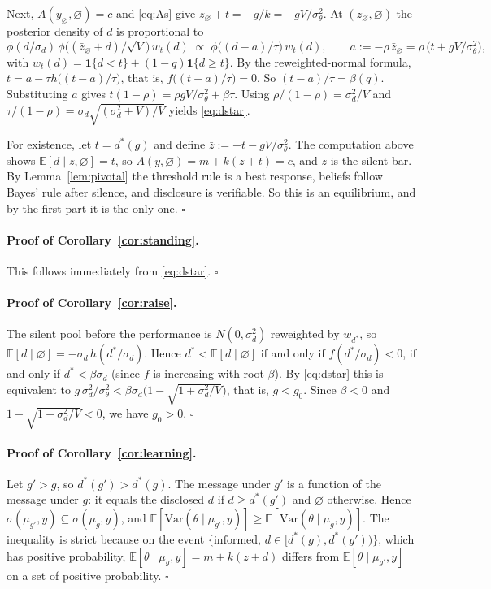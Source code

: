 \documentclass[11pt]{article}
\theoremstyle{definition}
\newcommand{\E}{\mathbb{E}}
\newcommand{\Var}{\mathrm{Var}}
\newcommand{\sil}{\varnothing}
\newcommand{\sd}{\sigma_d}
\newcommand{\sth}{\sigma_\theta}
\begin{document}
Next, $A(\bar y_\sil,\sil)=c$ and \eqref{eq:As} give $\bar z_\sil+t=-g/k=-gV/\sth^2$. At $(\bar z_\sil,\sil)$ the posterior density of $d$ is proportional to
\[
\phi(d/\sd)\,\phi\big((\bar z_\sil+d)/\sqrt V\big)\,w_t(d)\;\propto\;\phi\big((d-a)/\tau\big)\,w_t(d),\qquad a:=-\rho\,\bar z_\sil=\rho\,\big(t+gV/\sth^2\big),
\]
with $w_t(d)=\mathbf 1\{d<t\}+(1-q)\mathbf 1\{d\ge t\}$. By the reweighted-normal formula, $t=a-\tau h\big((t-a)/\tau\big)$, that is, $f\big((t-a)/\tau\big)=0$. So $(t-a)/\tau=\beta(q)$. Substituting $a$ gives $t(1-\rho)=\rho gV/\sth^2+\beta\tau$. Using $\rho/(1-\rho)=\sd^2/V$ and $\tau/(1-\rho)=\sd\sqrt{(\sd^2+V)/V}$ yields \eqref{eq:dstar}.

For existence, let $t=d^*(g)$ and define $\bar z:=-t-gV/\sth^2$. The computation above shows $\E[d\mid\bar z,\sil]=t$, so $A(\bar y,\sil)=m+k(\bar z+t)=c$, and $\bar z$ is the silent bar. By Lemma~\ref{lem:pivotal} the threshold rule is a best response, beliefs follow Bayes' rule after silence, and disclosure is verifiable. So this is an equilibrium, and by the first part it is the only one. \hfill$\square$

\paragraph{Proof of Corollary~\ref{cor:standing}.} This follows immediately from \eqref{eq:dstar}. \hfill$\square$

\paragraph{Proof of Corollary~\ref{cor:raise}.} The silent pool before the performance is $N(0,\sd^2)$ reweighted by $w_{d^*}$, so $\E[d\mid\sil]=-\sd\,h(d^*/\sd)$. Hence $d^*<\E[d\mid\sil]$ if and only if $f(d^*/\sd)<0$, if and only if $d^*<\beta\sd$ (since $f$ is increasing with root $\beta$). By \eqref{eq:dstar} this is equivalent to $g\,\sd^2/\sth^2<\beta\sd\big(1-\sqrt{1+\sd^2/V}\big)$, that is, $g<g_0$. Since $\beta<0$ and $1-\sqrt{1+\sd^2/V}<0$, we have $g_0>0$. \hfill$\square$

\paragraph{Proof of Corollary~\ref{cor:learning}.} Let $g'>g$, so $d^*(g')>d^*(g)$. The message under $g'$ is a function of the message under $g$: it equals the disclosed $d$ if $d\ge d^*(g')$ and $\sil$ otherwise. Hence $\sigma(\mu_{g'},y)\subseteq\sigma(\mu_g,y)$, and $\E[\Var(\theta\mid\mu_{g'},y)]\ge\E[\Var(\theta\mid\mu_g,y)]$. The inequality is strict because on the event $\{\text{informed},\,d\in[d^*(g),d^*(g'))\}$, which has positive probability, $\E[\theta\mid\mu_{g},y]=m+k(z+d)$ differs from $\E[\theta\mid\mu_{g'},y]$ on a set of positive probability. \hfill$\square$
\end{document}
